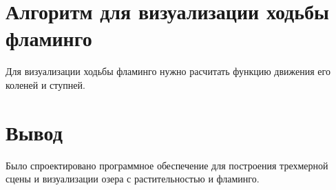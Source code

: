 \section{Алгоритм для визуализации ходьбы фламинго}

Для визуализации ходьбы фламинго нужно расчитать функцию движения его коленей и ступней.

\section{Вывод}

Было спроектировано программное обеспечение для построения трехмерной сцены и визуализации озера с растительностью и фламинго.